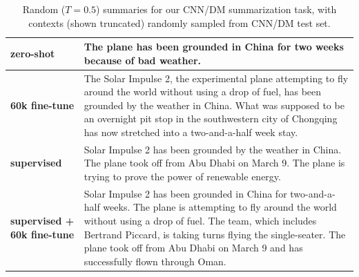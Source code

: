 \begin{table}[t]
\begin{center}
\begin{tabular}{|p{2cm}|p{12cm}|}
\textbf{zero-shot}
&
The plane has been grounded in China for two weeks because of bad weather.
\\
\hline
\textbf{60k fine-tune}
&
The Solar Impulse 2, the experimental plane attempting to fly around the world without using a drop of fuel, has been grounded by the weather in China.
\newline\newline
What was supposed to be an overnight pit stop in the southwestern city of Chongqing has now stretched into a two-and-a-half week stay.
\\
\hline
\textbf{supervised}
&
Solar Impulse 2 has been grounded by the weather in China. The plane took off from Abu Dhabi on March 9. The plane is trying to prove the power of renewable energy.
\\
\hline
\textbf{supervised + 60k fine-tune}
&
Solar Impulse 2 has been grounded in China for two-and-a-half weeks. The plane is attempting to fly around the world without using a drop of fuel. The team, which includes Bertrand Piccard, is taking turns flying the single-seater. The plane took off from Abu Dhabi on March 9 and has successfully flown through Oman.
\\
\hline


\end{tabular}
\caption{Random ($T=0.5$) summaries for our CNN/DM summarization task, with contexts (shown truncated) randomly sampled from CNN/DM test set.}
\label{tab:samples-summarization-cnndm3}
\end{center}
\end{table}
    
